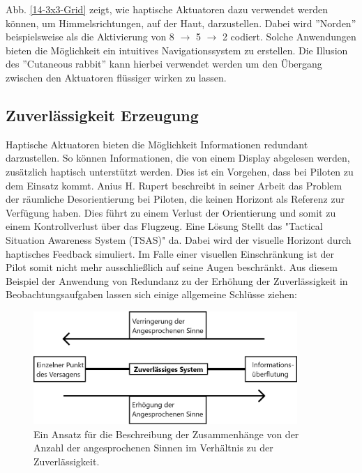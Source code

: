 \documentclass{llncs}					%
\begin{document}
Abb. \ref{14-3x3-Grid} zeigt, wie haptische Aktuatoren dazu verwendet werden können, um Himmelsrichtungen, auf der Haut, darzustellen. Dabei wird ''Norden'' beispielsweise als die Aktivierung von 8 $\rightarrow$ 5 $\rightarrow$ 2 codiert. Solche Anwendungen bieten die Möglichkeit ein intuitives Navigationssystem zu erstellen\cite{tan2003haptic}. Die Illusion des ''Cutaneous rabbit'' kann hierbei verwendet werden um den Übergang zwischen den Aktuatoren flüssiger wirken zu lassen.

\clearpage
\subsection{Zuverlässigkeit Erzeugung}
Haptische Aktuatoren bieten die Möglichkeit Informationen redundant darzustellen. So können Informationen, die von einem Display abgelesen werden, zusätzlich haptisch unterstützt werden. Dies ist ein Vorgehen, dass bei Piloten zu dem Einsatz kommt.
Anius H. Rupert\cite{rupert2000instrumentation} beschreibt in seiner Arbeit das Problem der räumliche Desorientierung bei Piloten, die keinen Horizont als Referenz zur Verfügung haben. Dies führt zu einem Verlust der Orientierung und somit zu einem Kontrollverlust über das Flugzeug. Eine Lösung Stellt das "Tactical Situation Awareness System (TSAS)"\cite{rupert2000instrumentation} da. Dabei wird der visuelle Horizont durch haptisches Feedback simuliert\cite{rupert2000instrumentation}. Im Falle einer visuellen Einschränkung ist der Pilot somit nicht mehr ausschließlich auf seine Augen beschränkt.
Aus diesem Beispiel der Anwendung von Redundanz zu der Erhöhung der Zuverlässigkeit in Beobachtungsaufgaben lassen sich einige allgemeine Schlüsse ziehen:

\begin{figure}[htbp]
	\begin{center}
		\includegraphics[width = 10cm]{Grafiken/Sinne-Redundanz-Verhaeltnis.png}
		\caption{Ein Ansatz für die Beschreibung der Zusammenhänge von der Anzahl der angesprochenen Sinnen im Verhältnis zu der Zuverlässigkeit.}
		\label{Sinne_Redundanz_Verhaeltnis}
	\end{center}
\end{figure}
\end{document}
